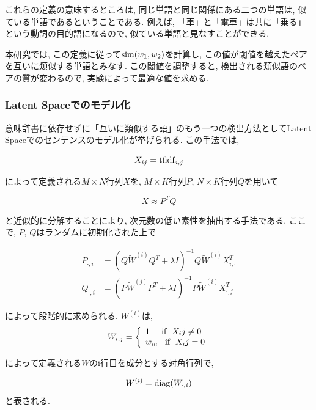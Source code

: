 \documentclass[12pt]{jarticle}
\begin{document}
これらの定義の意味するところは, 同じ単語と同じ関係にある二つの単語は, 似ている単語であるということである. 例えば, 「車」と「電車」は共に「乗る」という動詞の目的語になるので, 似ている単語と見なすことができる.

本研究では, この定義に従って${\rm sim}(w_1, w_2)$を計算し, この値が閾値を越えたペアを互いに類似する単語とみなす. この閾値を調整すると, 検出される類似語のペアの質が変わるので, 実験によって最適な値を求める.

\subsubsection{Latent Spaceでのモデル化}
意味辞書に依存せずに「互いに類似する語」のもう一つの検出方法としてLatent Spaceでのセンテンスのモデル化\cite{LatentSpace}が挙げられる. この手法では,

\begin{equation}
  X_{ij} = {\rm tfidf}_{i,j}
\end{equation}

によって定義される$M \times N$行列$X$を, $M \times K$行列$P$, $N \times K$行列$Q$を用いて

\begin{equation}
  X \approx P^T Q
\end{equation}

と近似的に分解することにより, 次元数の低い素性を抽出する手法である. ここで, $P$, $Q$はランダムに初期化された上で

\begin{align}
  P_{\cdot ,i} &= (Q\tilde W^{(i)}Q^T + \lambda I)^{-1} Q \tilde W^{(i)} X_{i, \cdot }^T \\
  Q_{\cdot ,i} &= (P\tilde W^{(j)}P^T + \lambda I)^{-1} P \tilde W^{(i)} X_{\cdot , j}^T
\end{align}

によって段階的に求められる. $W^{(i)}$は,
\begin{displaymath}
W_{i,j} = \left\{
\begin{array}{l}
1\;\;\;\;\;{\rm if} \;\; X_ij \neq 0 \\
w_m\;\;\;{\rm if} \;\; X_ij = 0
\end{array}
\right.
\end{displaymath}

によって定義される$W$のi行目を成分とする対角行列で,

\begin{equation}
  W^{(i)} = {\rm diag}(W_{\cdot, i})
\end{equation}
と表される.
\end{document}
